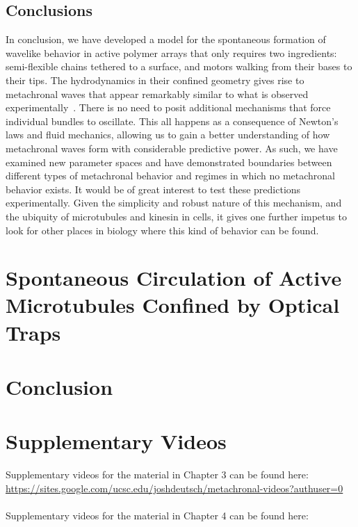 \documentclass[11pt]{ucthesis}
\begin{document}
\section{Conclusions}
In conclusion,
we have developed a model for the spontaneous formation of wavelike
behavior in active polymer arrays that only requires two ingredients:
semi-flexible chains tethered to a surface, and motors walking from
their bases to their tips. The hydrodynamics in their confined
geometry gives rise to metachronal waves that appear remarkably
similar to what is observed experimentally~\cite{Sanchez2011,sanchez2013engineering}.
There is no need to posit additional mechanisms that force
individual bundles to oscillate. This all happens as a consequence of Newton's
laws and fluid mechanics, allowing us to
gain a better understanding of how metachronal waves form with
considerable predictive power. As such, we have examined new parameter spaces and have
demonstrated boundaries between different types of metachronal
behavior and regimes in which no metachronal behavior exists.
It would be of great interest to test these predictions
experimentally.
Given the simplicity and robust nature of this mechanism, 
and the ubiquity of microtubules and kinesin in cells, it
gives one further impetus to look for other places in biology
where this kind of behavior can be found.


\chapter{Spontaneous Circulation of Active Microtubules Confined by Optical Traps}

\chapter{Conclusion}

\nocite{*}



\appendix
\chapter{Supplementary Videos}
\noindent
Supplementary videos for the material in Chapter 3 can be found here:\\
\url{https://sites.google.com/ucsc.edu/joshdeutsch/metachronal-videos?authuser=0}\\ \\
Supplementary videos for the material in Chapter 4 can be found here:
\end{document}
